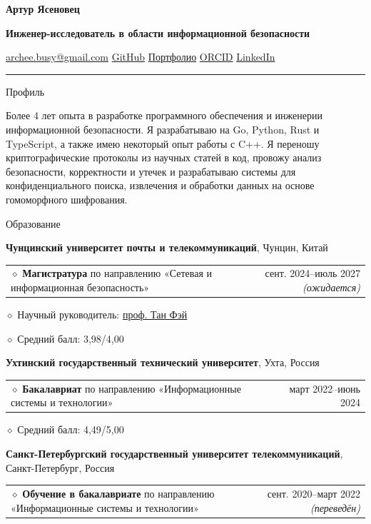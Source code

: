 \documentclass[11pt,a4paper]{article}
\makeatletter
\newcommand{\cvrow}[2]{%
  \noindent
  \begin{minipage}[t]{0.145\textwidth}
    \vspace{0pt}%
    \raggedright
    \fontsize{10.5}{12.5}\selectfont
    #1
  \end{minipage}%
  \hfill
  \begin{minipage}[t]{0.835\textwidth}
    \vspace{0pt}%
    #2
  \end{minipage}\par
}
\newcommand{\eduentry}[2]{%
  \noindent
  \begin{tabularx}{\linewidth}
    {@{}X@{\hspace{0.8em}}r@{}}
    #1 & \small #2
  \end{tabularx}\par
  \vspace{0.15em}
}
\newcommand{\edudetail}[1]{%
  \noindent\hspace*{1.15em}$\diamond$ #1\par
}
\makeatother
\begin{document}
{\fontsize{24}{28}\selectfont\bfseries Артур Ясеновец}\par
\vspace{0.08em}
{\large\bfseries Инженер-исследователь в области информационной безопасности}\par
\vspace{0.28em}
\href{mailto:archee.busy@gmail.com}{archee.busy@gmail.com}
\;\textbullet\;
\href{https://github.com/iasenovets}{GitHub}
\;\textbullet\;
\href{https://iasenovets.github.io/}{Портфолио}
\;\textbullet\;
\href{https://orcid.org/0009-0008-0008-3746}{ORCID}
\;\textbullet\;
\href{https://linkedin.com/in/iasenovets}{LinkedIn}
\par
\vspace{0.22em}
\hrule
\vspace{0.55em}

\cvrow{Профиль}{%
  Более 4 лет опыта в разработке программного обеспечения и инженерии
  информационной безопасности. Я разрабатываю на Go, Python, Rust и TypeScript,
  а также имею некоторый опыт работы с C++. Я переношу криптографические
  протоколы из научных статей в код, провожу анализ безопасности, корректности
  и утечек и разрабатываю системы для конфиденциального поиска, извлечения
  и обработки данных на основе гомоморфного шифрования.
}

\vspace{0.75em}

\cvrow{Образование}{%
  \raggedright

  \textbf{Чунцинский университет почты и телекоммуникаций},
  Чунцин, Китай\par
  \vspace{0.12em}

  \eduentry
    {$\diamond$ \textbf{Магистратура} по направлению «Сетевая и информационная безопасность»}
    {сент. 2024--июль 2027 \textit{(ожидается)}}

  \edudetail{Научный руководитель:
    \href{https://faculty.cqupt.edu.cn/tangfei/en/index.htm}{проф. Тан Фэй}}
  \edudetail{Средний балл: 3,98/4,00}

  \vspace{0.48em}

  \textbf{Ухтинский государственный технический университет},
  Ухта, Россия\par
  \vspace{0.12em}

  \eduentry
    {$\diamond$ \textbf{Бакалавриат} по направлению «Информационные системы и технологии»}
    {март 2022--июнь 2024}

  \edudetail{Средний балл: 4,49/5,00}

  \vspace{0.48em}

  \textbf{Санкт-Петербургский государственный университет телекоммуникаций},
  Санкт-Петербург, Россия\par
  \vspace{0.12em}

  \eduentry
    {$\diamond$ \textbf{Обучение в бакалавриате} по направлению «Информационные системы и технологии»}
    {сент. 2020--март 2022 \textit{(переведён)}}
}
\end{document}
